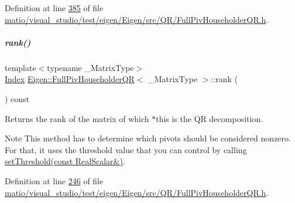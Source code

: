 Definition at line \hyperlink{matio_2visual__studio_2test_2eigen_2_eigen_2src_2_q_r_2_full_piv_householder_q_r_8h_source_l00385}{385} of file \hyperlink{matio_2visual__studio_2test_2eigen_2_eigen_2src_2_q_r_2_full_piv_householder_q_r_8h_source}{matio/visual\+\_\+studio/test/eigen/\+Eigen/src/\+Q\+R/\+Full\+Piv\+Householder\+Q\+R.\+h}.

\mbox{\label{group___q_r___module_aeae555220f46477818ccc94aca2de770}} 
\subparagraph{\texorpdfstring{rank()}{rank()}\hspace{0.1cm}{\footnotesize\ttfamily [1/2]}}
{\footnotesize\ttfamily template$<$typename \+\_\+\+Matrix\+Type$>$ \\
\hyperlink{namespace_eigen_a62e77e0933482dafde8fe197d9a2cfde}{Index} \hyperlink{group___q_r___module_class_eigen_1_1_full_piv_householder_q_r}{Eigen\+::\+Full\+Piv\+Householder\+QR}$<$ \+\_\+\+Matrix\+Type $>$\+::rank (\begin{DoxyParamCaption}{ }\end{DoxyParamCaption}) const\hspace{0.3cm}{\ttfamily [inline]}}

\begin{DoxyReturn}{Returns}
the rank of the matrix of which $\ast$this is the QR decomposition.
\end{DoxyReturn}
\begin{DoxyNote}{Note}
This method has to determine which pivots should be considered nonzero. For that, it uses the threshold value that you can control by calling \hyperlink{group___q_r___module_a92277e572bf98245891015d12dd2b602}{set\+Threshold(const Real\+Scalar\&)}. 
\end{DoxyNote}


Definition at line \hyperlink{matio_2visual__studio_2test_2eigen_2_eigen_2src_2_q_r_2_full_piv_householder_q_r_8h_source_l00246}{246} of file \hyperlink{matio_2visual__studio_2test_2eigen_2_eigen_2src_2_q_r_2_full_piv_householder_q_r_8h_source}{matio/visual\+\_\+studio/test/eigen/\+Eigen/src/\+Q\+R/\+Full\+Piv\+Householder\+Q\+R.\+h}.


